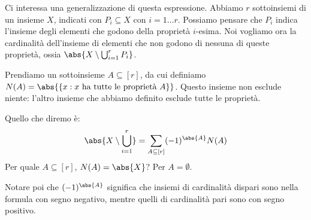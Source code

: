 Ci interessa una generalizzazione di questa espressione.
Abbiamo $r$ sottoinsiemi di un insieme $X$, indicati con $P_i \subseteq X$ con $i = 1 \dots r$.
Possiamo pensare che $P_i$ indica l'insieme degli elementi che godono della propriet\`a $i$-esima.
Noi vogliamo ora la cardinalit\`a dell'insieme di elementi che non godono di nessuna di queste propriet\`a, ossia $\abs{X \setminus \bigcup_{i=1}^{r} P_i}$.

Prendiamo un sottoinsieme $A \subseteq [r]$, da cui definiamo $N(A) = \abs{\{ x : x \text{ ha tutte le propriet\`a } A\}}$.
Questo insieme non esclude niente: l'altro insieme che abbiamo definito esclude tutte le propriet\`a.

Quello che diremo \`e:
\[
	\abs{X \setminus \bigcup_{i=1}^{r}} =
	\sum_{A \subseteq [r]} (-1)^{\abs{A}} N(A)
\]
Per quale $A \subseteq [r]$, $N(A) = \abs{X}$?
Per $A = \emptyset$.

Notare poi che $(-1)^{\abs{A}}$ significa che insiemi di cardinalit\`a dispari sono nella formula con segno negativo, mentre quelli di cardinalit\`a pari sono con segno positivo.

